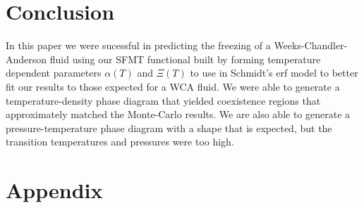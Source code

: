 \documentclass[double,12pt]{beavtex}
\begin{document}
\begin{figure}
  \centering
  \label{fig:p-vs-T_at_fixed_density}
\end{figure}





\chapter{Conclusion}
In this paper we were sucessful in predicting the freezing of a 
Weeks-Chandler-Anderson fluid using our SFMT functional built by 
forming temperature dependent parameters $\alpha(T)$ and $\Xi(T)$ to use 
in Schmidt's erf model to better fit our results to those expected for a
WCA fluid. We were able to generate a temperature-density 
phase diagram that yielded coexistence regions that approximately 
matched the Monte-Carlo
results. 
We are also able to generate a pressure-temperature
phase diagram with a shape that is expected, but the transition 
temperatures and pressures were too high. 



\backmatter

\chapter{Appendix}
\end{document}
